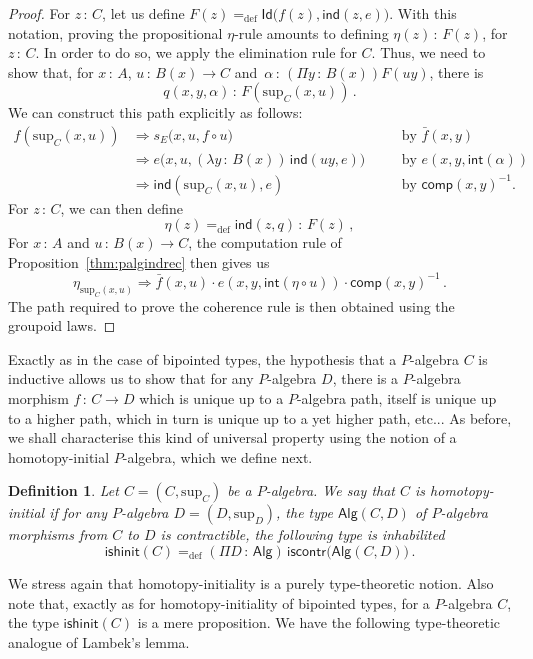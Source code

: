 \documentclass[10pt,a4paper,oneside,reqno]{amsart}
\numberwithin{equation}{section}
\theoremstyle{mythm}
\theoremstyle{mydef}
\newtheorem{definition}[theorem]{Definition}
\theoremstyle{myrmk}
\newcommand{\ie}{\text{i.e.\ }}
\newcommand{\by}[1]{\quad&&\text{by {$#1$}}}
\newcommand{\defeq}{=_{\mathrm{def}}}
\newcommand{\co}{\,{:}\,}
\newcommand{\iscontr}{\mathsf{iscontr}}
\newcommand{\isalghinit}{\mathsf{ishinit}}
\renewcommand{\int}{\mathsf{int}}
\newcommand{\Id}{\mathsf{Id}}
\newcommand{\ind}{\mathsf{ind}}
\newcommand{\comp}{\mathsf{comp}}
\newcommand{\Palg}{\mathsf{Alg}}
\renewcommand{\sup}{\mathrm{sup}}
\begin{document}
\begin{proof} For $z \co C$, let us define $F(z) \defeq \Id \big(   f(z), \ind(z,e))$. With this notation, proving
 the propositional $\eta$-rule amounts to defining $\eta(z) \co F(z)$, for $z \co C$. In order to do so, we apply
the elimination rule for $C$. Thus, we need to show that, for $x \co A$, $u \co B(x) \to C$ and~$\alpha \co 
(\Pi y \co B(x)) F(uy)$, there 
is 
\[
q(x,y,\alpha) \co   F(\sup_C(x,u)) \, .
\]
We can construct this path explicitly as follows:
\begin{align*}
f(\sup_C(x,u)) &\Rightarrow s_E\big(x,u , f \circ u \big)   \by{\bar{f}(x,y)}\\
	&\Rightarrow e\big(x,u, (\lambda y \co B(x) )\, \ind(u y ,e) \big) \by{e(x,y,\int(\alpha))}\\
	& \Rightarrow \ind(\sup_C(x,u),e) \by{\comp(x,y)^{-1}}.
\end{align*}
For $z \co C$, we can then define
\[
\eta(z) \defeq \ind(z,q) \co F(z) \, ,
\] 
For $x \co A$ and $u \co B(x) \to C$, the  computation rule of Proposition~\ref{thm:palgindrec} then gives us
\[
 \eta_{\sup_C(x,u)} \Rightarrow  \bar{f}(x,u) \cdot e(x,y,\int(  \eta \circ u ))  \cdot  \comp(x,y)^{-1} \, .
\]
The path required to prove  the coherence rule is then obtained using the groupoid laws.
\end{proof}

Exactly as in the case of bipointed types, the hypothesis that a $P$-algebra $C$ is inductive allows us to show that for any
$P$-algebra $D$, there is a $P$-algebra morphism $f \co C \to D$ which is unique up to a $P$-algebra path, itself is unique up 
to a higher path, which in turn is unique up to a yet higher path, etc... As before, we shall characterise this kind of universal property
using the notion of a homotopy-initial $P$-algebra, which we define next.

\begin{definition}\label{def:AlgInit}
Let $C = (C, \sup_C)$ be a $P$-algebra. We say that $C$ is  \emph{homotopy-initial}  if for any $P$-algebra 
$D = (D, \sup_D)$, the type $\Palg(C,D)$ of $P$-algebra morphisms from $C$ to $D$
is contractible, \ie the following type is inhabilited
\[
\isalghinit(C) \defeq
 (\Pi D \co \Palg)  \, \iscontr \big( \Palg(C,D) \big)  \, .
\]  
\end{definition}

We stress again that homotopy-initiality is a purely type-theoretic notion. Also note that, exactly as for 
homotopy-initiality of bipointed types, for a $P$-algebra $C$, the type
$\isalghinit(C)$ is a mere proposition. 
We have the following type-theoretic analogue of Lambek's lemma.
\end{document}
